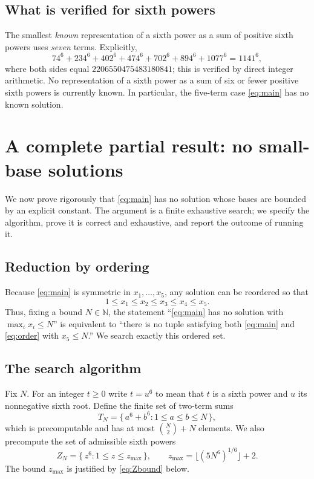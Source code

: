 \documentclass{amsart}
\begin{document}
\subsection*{What is verified for sixth powers}
The smallest \emph{known} representation of a sixth power as a sum of
positive sixth powers uses \emph{seven} terms. Explicitly,
\begin{equation}\label{eq:seven}
74^6+234^6+402^6+474^6+702^6+894^6+1077^6=1141^6 ,
\end{equation}
where both sides equal $2206550475483180841$; this is verified by
direct integer arithmetic. No representation of a sixth power as a sum
of six or fewer positive sixth powers is currently known. In
particular, the five-term case \eqref{eq:main} has no known solution.

\section*{A complete partial result: no small-base solutions}

We now prove rigorously that \eqref{eq:main} has no solution whose
bases are bounded by an explicit constant. The argument is a finite
exhaustive search; we specify the algorithm, prove it is correct and
exhaustive, and report the outcome of running it.

\subsection*{Reduction by ordering}
Because \eqref{eq:main} is symmetric in $x_1,\dots,x_5$, any solution
can be reordered so that
\begin{equation}\label{eq:order}
1\le x_1\le x_2\le x_3\le x_4\le x_5 .
\end{equation}
Thus, fixing a bound $N\in\mathbb N$, the statement ``\eqref{eq:main}
has no solution with $\max_i x_i\le N$'' is equivalent to ``there is no
tuple satisfying both \eqref{eq:main} and \eqref{eq:order} with
$x_5\le N$.'' We search exactly this ordered set.

\subsection*{The search algorithm}
Fix $N$. For an integer $t\ge 0$ write $t=u^6$ to mean that $t$ is a
sixth power and $u$ its nonnegative sixth root. Define the finite set
of two-term sums
\begin{equation}\label{eq:Tset}
T_N=\{\,a^6+b^6 : 1\le a\le b\le N\,\},
\end{equation}
which is precomputable and has at most $\binom{N}{2}+N$ elements. We
also precompute the set of admissible sixth powers
\begin{equation}\label{eq:Zset}
Z_N=\{\,z^6 : 1\le z\le z_{\max}\,\},\qquad
z_{\max}=\big\lfloor (5N^6)^{1/6}\big\rfloor+2 .
\end{equation}
The bound $z_{\max}$ is justified by \eqref{eq:Zbound} below.
\end{document}
